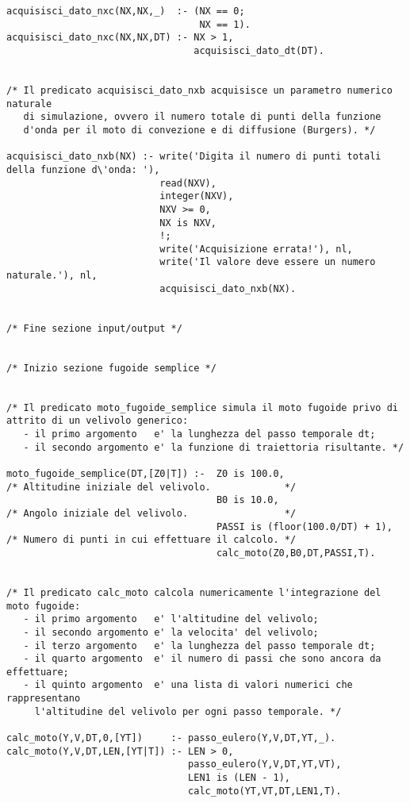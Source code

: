 \begin{verbatim}
acquisisci_dato_nxc(NX,NX,_)  :- (NX == 0;
                                  NX == 1).
acquisisci_dato_nxc(NX,NX,DT) :- NX > 1,
                                 acquisisci_dato_dt(DT).


/* Il predicato acquisisci_dato_nxb acquisisce un parametro numerico naturale 
   di simulazione, ovvero il numero totale di punti della funzione
   d'onda per il moto di convezione e di diffusione (Burgers). */

acquisisci_dato_nxb(NX) :- write('Digita il numero di punti totali della funzione d\'onda: '),
                           read(NXV),
                           integer(NXV),
                           NXV >= 0,
                           NX is NXV,
                           !;     
                           write('Acquisizione errata!'), nl,
                           write('Il valore deve essere un numero naturale.'), nl,
                           acquisisci_dato_nxb(NX).

      
/* Fine sezione input/output */


/* Inizio sezione fugoide semplice */


/* Il predicato moto_fugoide_semplice simula il moto fugoide privo di attrito di un velivolo generico:
   - il primo argomento   e' la lunghezza del passo temporale dt;
   - il secondo argomento e' la funzione di traiettoria risultante. */

moto_fugoide_semplice(DT,[Z0|T]) :-  Z0 is 100.0,                    /* Altitudine iniziale del velivolo.             */
                                     B0 is 10.0,                     /* Angolo iniziale del velivolo.                 */
                                     PASSI is (floor(100.0/DT) + 1), /* Numero di punti in cui effettuare il calcolo. */
                                     calc_moto(Z0,B0,DT,PASSI,T).


/* Il predicato calc_moto calcola numericamente l'integrazione del moto fugoide:
   - il primo argomento   e' l'altitudine del velivolo;
   - il secondo argomento e' la velocita' del velivolo;
   - il terzo argomento   e' la lunghezza del passo temporale dt;
   - il quarto argomento  e' il numero di passi che sono ancora da effettuare;
   - il quinto argomento  e' una lista di valori numerici che rappresentano 
     l'altitudine del velivolo per ogni passo temporale. */

calc_moto(Y,V,DT,0,[YT])     :- passo_eulero(Y,V,DT,YT,_).  
calc_moto(Y,V,DT,LEN,[YT|T]) :- LEN > 0,
                                passo_eulero(Y,V,DT,YT,VT),
                                LEN1 is (LEN - 1),
                                calc_moto(YT,VT,DT,LEN1,T).



\end{verbatim}

